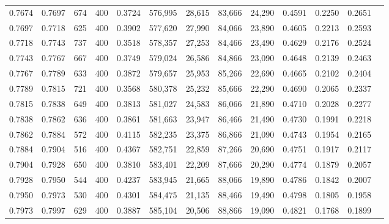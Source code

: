 \begin{tabular}{rrrrrrrrrrrrr}
0.7674 & 0.7697 &    674 & 400 &                                     0.3724 & 576,995 &  28,615 &  83,666 &  24,290 & 0.4591 & 0.2250 & 0.2651 \\
0.7697 & 0.7718 &    625 & 400 &                                     0.3902 & 577,620 &  27,990 &  84,066 &  23,890 & 0.4605 & 0.2213 & 0.2593 \\
0.7718 & 0.7743 &    737 & 400 &                                     0.3518 & 578,357 &  27,253 &  84,466 &  23,490 & 0.4629 & 0.2176 & 0.2524 \\
0.7743 & 0.7767 &    667 & 400 &                                     0.3749 & 579,024 &  26,586 &  84,866 &  23,090 & 0.4648 & 0.2139 & 0.2463 \\
0.7767 & 0.7789 &    633 & 400 &                                     0.3872 & 579,657 &  25,953 &  85,266 &  22,690 & 0.4665 & 0.2102 & 0.2404 \\
0.7789 & 0.7815 &    721 & 400 &                                     0.3568 & 580,378 &  25,232 &  85,666 &  22,290 & 0.4690 & 0.2065 & 0.2337 \\
0.7815 & 0.7838 &    649 & 400 &                                     0.3813 & 581,027 &  24,583 &  86,066 &  21,890 & 0.4710 & 0.2028 & 0.2277 \\
0.7838 & 0.7862 &    636 & 400 &                                     0.3861 & 581,663 &  23,947 &  86,466 &  21,490 & 0.4730 & 0.1991 & 0.2218 \\
0.7862 & 0.7884 &    572 & 400 &                                     0.4115 & 582,235 &  23,375 &  86,866 &  21,090 & 0.4743 & 0.1954 & 0.2165 \\
0.7884 & 0.7904 &    516 & 400 &                                     0.4367 & 582,751 &  22,859 &  87,266 &  20,690 & 0.4751 & 0.1917 & 0.2117 \\
0.7904 & 0.7928 &    650 & 400 &                                     0.3810 & 583,401 &  22,209 &  87,666 &  20,290 & 0.4774 & 0.1879 & 0.2057 \\
0.7928 & 0.7950 &    544 & 400 &                                     0.4237 & 583,945 &  21,665 &  88,066 &  19,890 & 0.4786 & 0.1842 & 0.2007 \\
0.7950 & 0.7973 &    530 & 400 &                                     0.4301 & 584,475 &  21,135 &  88,466 &  19,490 & 0.4798 & 0.1805 & 0.1958 \\
0.7973 & 0.7997 &    629 & 400 &                                     0.3887 & 585,104 &  20,506 &  88,866 &  19,090 & 0.4821 & 0.1768 & 0.1899 \\

\end{tabular}
